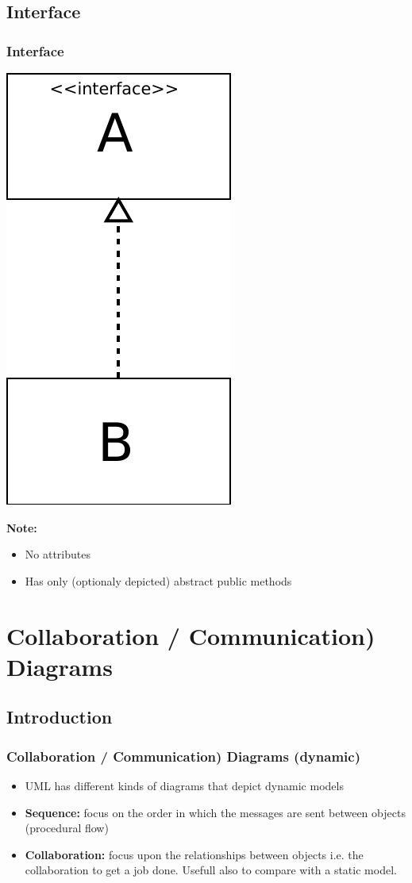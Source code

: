 \documentclass{beamer}
\begin{document}
\subsection{Interface}
\begin{frame}
	\frametitle{Interface}
	\begin{center}
		\includegraphics[scale=0.4]{interface}
	\end{center}
	\textbf{Note:}
	\begin{itemize}
  			\item No attributes
  			\item Has only (optionaly depicted) abstract public methods
	\end{itemize}
\end{frame}

\section{Collaboration / Communication) Diagrams}
\subsection{Introduction}
\begin{frame}
	\frametitle{Collaboration / Communication) Diagrams (dynamic)}
	\begin{itemize}
  			\item<+-> UML has different kinds of diagrams that depict dynamic models
  			\item<+-> \textbf{Sequence:} focus on the order in which the messages are sent between objects (procedural flow)
  			\item<+-> \textbf{Collaboration:} focus upon the relationships between objects i.e. the collaboration to get a job done. Usefull also to compare with a static model. 
	\end{itemize}
\end{frame}
\end{document}

